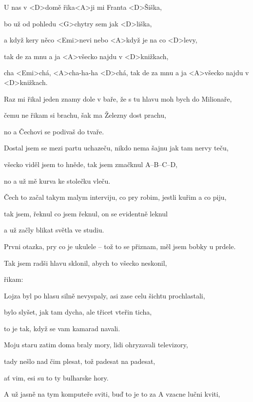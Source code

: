 


\zs
U nas v <D>domě řika<A>ji mi Franta <D>Šiška,

bo už od pohledu <G>chytry sem jak <D>liška,

a když kery něco <Emi>nevi nebo <A>když je na co <D>levy,

tak de za mnu a ja <A>všecko najdu v <D>knižkach,

cha <Emi>chá, <A>cha-ha-ha <D>chá, tak de za mnu a ja <A>všecko najdu v <D>knižkach.
\ks

\zs
Raz mi řikal jeden znamy dole v baře, že s tu hlavu moh bych do Milionaře,

čemu ne řikam si brachu, šak ma Železny dost prachu,

no a Čechovi se podivaš do tvaře.
\ks

\zs
Dostal jsem se mezi partu uchazeču, nikdo nema šajnu jak tam nervy teču,

všecko viděl jsem to hněde, tak jsem zmačknul A--B--C--D,

no a už mě kurva ke stolečku vleču.
\ks

\zs
Čech to začal takym malym interviju, co pry robim, jestli kuřim a co piju,

tak jsem, řeknul co jsem řeknul, on se evidentně leknul

a už začly blikat světla ve studiu.
\ks

\zs
Prvni otazka, pry co je ukulele -- tož to se přiznam, měl jsem bobky u prdele.

Tak jsem radši hlavu sklonil, abych to všecko neskonil,

řikam: 
\ks

\zs
Lojza byl po hlasu silně nevyspaly, asi zase celu šichtu prochlastali,

bylo slyšet, jak tam dycha, ale třicet vteřin ticha,

to je tak, když se vam kamarad navali.
\ks

\zs
Moju staru zatim doma braly mory, lidi ohryzavali televizory,

tady nešlo nad čim plesat, tož padesat na padesat,

ať vim, esi su to ty bulharske hory.
\ks

\zs
A už jasně na tym komputeře sviti, buď to je to za A vzacne lučni kviti,

